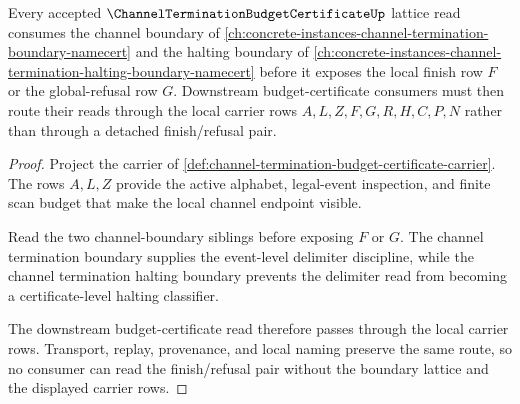 \begin{theorem}
\label{thm:channel-termination-budget-certificate-lattice-route}
Every accepted $\ChannelTerminationBudgetCertificateUp$ lattice read consumes the channel boundary of \autoref{ch:concrete-instances-channel-termination-boundary-namecert} and the halting boundary of \autoref{ch:concrete-instances-channel-termination-halting-boundary-namecert} before it exposes the local finish row $F$ or the global-refusal row $G$. Downstream budget-certificate consumers must then route their reads through the local carrier rows $A,L,Z,F,G,R,H,C,P,N$ rather than through a detached finish/refusal pair.
\end{theorem}
\begin{proof}
Project the carrier of \autoref{def:channel-termination-budget-certificate-carrier}. The rows $A,L,Z$ provide the active alphabet, legal-event inspection, and finite scan budget that make the local channel endpoint visible.

Read the two channel-boundary siblings before exposing $F$ or $G$. The channel termination boundary supplies the event-level delimiter discipline, while the channel termination halting boundary prevents the delimiter read from becoming a certificate-level halting classifier.

The downstream budget-certificate read therefore passes through the local carrier rows. Transport, replay, provenance, and local naming preserve the same route, so no consumer can read the finish/refusal pair without the boundary lattice and the displayed carrier rows.
\end{proof}
